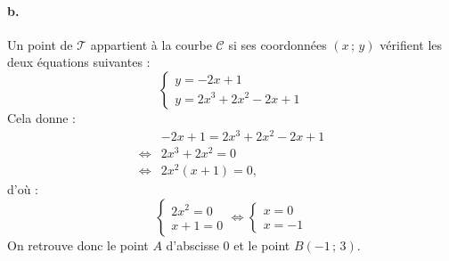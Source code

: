 \paragraph{b.} Un point de \(\mathcal{T}\) appartient à la courbe \(\mathcal{C}\) si ses coordonnées \((x\,;\,y)\) vérifient les deux équations suivantes :
\[
\begin{cases}
y = -2x + 1 \\
y = 2x^3 + 2x^2 - 2x + 1
\end{cases}
\]
Cela donne :
\begin{align*}
&-2x + 1 = 2x^3 + 2x^2 - 2x + 1 \\
\iff &2x^3 + 2x^2 = 0 \\
\iff &2x^2(x + 1) = 0,
\end{align*}
d'où :
\[
\left\{
\begin{array}{l}
2x^2 = 0 \\
x + 1 = 0
\end{array}
\right.
\iff
\left\{
\begin{array}{l}
x = 0 \\
x = -1
\end{array}
\right.
\]
On retrouve donc le point \(A\) d'abscisse \(0\) et le point \(B(-1\,;\,3)\).
